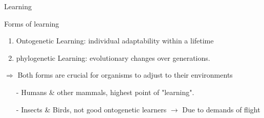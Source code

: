 \documentclass[xetex,notheorems,hyperref={pdfpagelabels=true},xcolor=table]{beamer}
\theoremstyle{plain}
\theoremstyle{definition}
\theoremstyle{example}
\theoremstyle{example}
\begin{document}

\begin{frame}{Learning}
\begin{block}{Forms of learning}
\begin{enumerate}[\indent $\blacksquare$]
    \item Ontogenetic Learning: individual adaptability within a lifetime 
    \item phylogenetic Learning: evolutionary changes over generations. 
\end{enumerate}
\end{block}
$\Rightarrow$ Both forms are crucial for organisms to adjust to their environments
\begin{figure}[h]
  \centering
\end{figure}
\begin{itemize}
    \item[-] Humans \& other mammals, highest point of "learning". 
    \item[-] Insects \& Birds, not good ontogenetic learners $\rightarrow$ Due to demands of flight
\end{itemize}
\end{frame}
\end{document}
